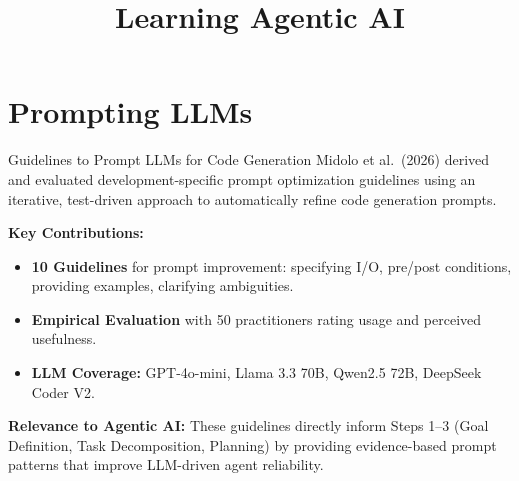 \documentclass[
11pt,notheorems,hyperref={pdfauthor=whatever}
]{beamer}
\title[Agentic AI]{Learning Agentic AI}
\begin{document}

\section{Prompting LLMs}

\begin{frame}{Guidelines to Prompt LLMs for Code Generation}
	Midolo et al.\ (2026) derived and evaluated development-specific prompt optimization guidelines using an iterative, test-driven approach to automatically refine code generation prompts.

	\vspace{0.3cm}

	\textbf{Key Contributions:}
	\begin{itemize}
		\item \textbf{10 Guidelines} for prompt improvement: specifying I/O, pre/post conditions, providing examples, clarifying ambiguities.
		\item \textbf{Empirical Evaluation} with 50 practitioners rating usage and perceived usefulness.
		\item \textbf{LLM Coverage:} GPT-4o-mini, Llama 3.3 70B, Qwen2.5 72B, DeepSeek Coder V2.
	\end{itemize}

	\vspace{0.3cm}

	\textbf{Relevance to Agentic AI:} These guidelines directly inform Steps 1--3 (Goal Definition, Task Decomposition, Planning) by providing evidence-based prompt patterns that improve LLM-driven agent reliability.
\end{frame}
\end{document}
